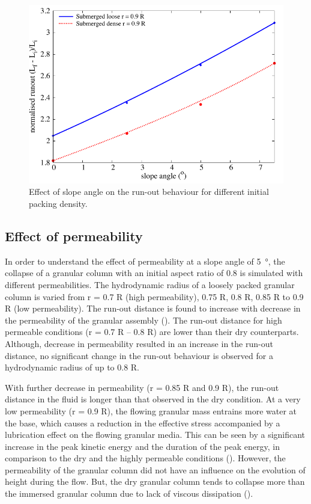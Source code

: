 \begin{figure}
\centering
\includegraphics[width=0.97\columnwidth]{slope_runout}
\caption{Effect of slope angle on the run-out behaviour for different initial 
packing density.}
\label{fig:slope_runout}
\end{figure}

\clearpage
\subsection{Effect of permeability}

In order to understand the effect of permeability at a slope angle of 
\SI{5}{\degree}, the collapse of a granular column with an initial aspect ratio 
of 0.8 is simulated with different permeabilities. The hydrodynamic radius of 
a loosely packed granular column is varied from r = 0.7 R (high permeability), 
0.75 R, 0.8 R, 0.85 R to 0.9 R (low permeability). The run-out distance is 
found to increase with decrease in the permeability of the granular assembly 
(). The run-out distance for high permeable conditions (r = 
0.7 R -- 0.8 R) are lower than their dry counterparts. Although, decrease in 
permeability resulted in an increase in the run-out distance, no significant 
change in the run-out behaviour is observed for a hydrodynamic radius of up to 
0.8 R.

With further decrease in permeability (r = 0.85 R and 0.9 R), the run-out 
distance in the fluid is longer than that observed in the dry 
condition. At a very low permeability (r = 0.9 R), the flowing granular mass
entrains more water at the base, which causes a reduction in the effective 
stress accompanied by a lubrication effect on the flowing granular media. This 
can be seen by a significant increase in the peak kinetic energy and the 
duration of the peak energy, in comparison to the dry and the highly permeable 
conditions (). However, the permeability of the granular 
column did not have an influence on the evolution of height during the flow. 
But, the dry granular column tends to collapse more than the immersed granular 
column due to lack of viscous dissipation ().

